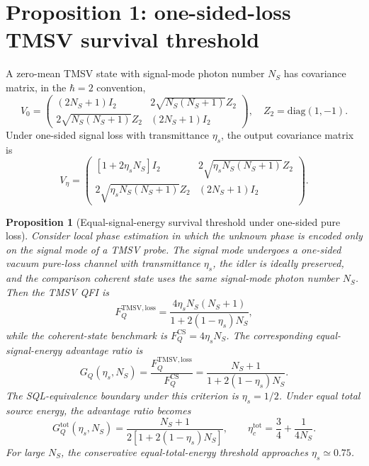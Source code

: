 \documentclass[a4paper,11pt]{article}
\numberwithin{equation}{section}
\newtheorem{proposition}{Proposition}
\newcommand{\Ns}{N_{S}}
\newcommand{\etas}{\eta_s}
\newcommand{\GQ}{G_Q}
\newcommand{\Gtot}{G_Q^{\mathrm{tot}}}
\begin{document}
\section{Proposition 1: one-sided-loss TMSV survival threshold}
\label{sec:tmsv_qfi}

A zero-mean TMSV state with signal-mode photon number $\Ns$ has covariance matrix, in the $\hbar=2$ convention,
\begin{equation}
V_0=
\begin{pmatrix}
(2\Ns+1)I_2 & 2\sqrt{\Ns(\Ns+1)}Z_2\\
2\sqrt{\Ns(\Ns+1)}Z_2 & (2\Ns+1)I_2
\end{pmatrix},
\quad Z_2=\mathrm{diag}(1,-1).
\end{equation}
Under one-sided signal loss with transmittance $\etas$, the output covariance matrix is
\begin{equation}
V_{\eta}=
\begin{pmatrix}
[1+2\etas\Ns]I_2 & 2\sqrt{\etas\Ns(\Ns+1)}Z_2\\
2\sqrt{\etas\Ns(\Ns+1)}Z_2 & (2\Ns+1)I_2
\end{pmatrix}.
\end{equation}

\begin{proposition}[Equal-signal-energy survival threshold under one-sided pure loss]
Consider local phase estimation in which the unknown phase is encoded only on the signal mode of a TMSV probe. The signal mode undergoes a one-sided vacuum pure-loss channel with transmittance $\etas$, the idler is ideally preserved, and the comparison coherent state uses the same signal-mode photon number $\Ns$. Then the TMSV QFI is
\begin{equation}
  F_Q^{\mathrm{TMSV,loss}}=\frac{4\etas\Ns(\Ns+1)}{1+2(1-\etas)\Ns},
  \label{eq:tmsv_qfi}
\end{equation}
while the coherent-state benchmark is $F_Q^{\mathrm{CS}}=4\etas\Ns$. The corresponding equal-signal-energy advantage ratio is
\begin{equation}
  \GQ(\etas,\Ns)=\frac{F_Q^{\mathrm{TMSV,loss}}}{F_Q^{\mathrm{CS}}}
  =\frac{\Ns+1}{1+2(1-\etas)\Ns}.
  \label{eq:gq}
\end{equation}
The SQL-equivalence boundary under this criterion is $\etas=1/2$. Under equal total source energy, the advantage ratio becomes
\begin{equation}
  \Gtot(\etas,\Ns)=\frac{\Ns+1}{2[1+2(1-\etas)\Ns]},
  \qquad
  \eta_c^{\mathrm{tot}}=\frac{3}{4}+\frac{1}{4\Ns}.
  \label{eq:gtotal}
\end{equation}
For large $\Ns$, the conservative equal-total-energy threshold approaches $\etas\simeq0.75$.
\end{proposition}
\end{document}
